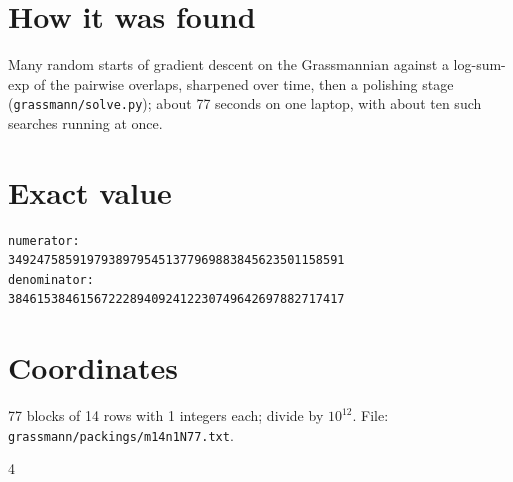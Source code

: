 \documentclass[11pt,a4paper]{article}
\begin{document}
\section{How it was found}
Many random starts of gradient descent on the Grassmannian against a log-sum-exp of the pairwise overlaps, sharpened over time, then a polishing stage (\texttt{grassmann/solve.py}); about 77 seconds on one laptop, with about ten such searches running at once.


\appendix
\section{Exact value}
{\small
\begin{verbatim}
numerator:
34924758591979389795451377969883845623501158591
denominator:
38461538461567222894092412230749642697882717417
\end{verbatim}}

\section{Coordinates}
77 blocks of 14 rows with 1 integers each; divide by $10^{12}$. File: \texttt{grassmann/packings/m14n1N77.txt}.
{\tiny
\begin{multicols}{4}
\end{multicols}}
\end{document}
